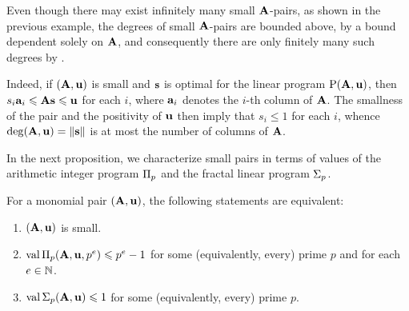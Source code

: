 \documentclass{amsart}
\begin{document}
\begin{remark}
   \label{rem: finitely many F-thresholds of small pairs}
   Even though there may exist infinitely many small $\mathbf{A}$-pairs, as shown in the previous example, the degrees of small $\mathbf{A}$-pairs are bounded above, by a bound dependent solely on $\mathbf{A}$, and consequently there are only finitely many such degrees by .
   

   Indeed, if $(\mathbf{A},\mathbf{u})$ is small and $\mathbf{s}$ is optimal for the linear program $\mathrm{P}(\mathbf{A},\mathbf{u})$, then $s_i\mathbf{a}_i \leqslant \mathbf{A}\mathbf{s} \leqslant \mathbf{u}$ for each $i$, where $\mathbf{a}_i$ denotes the $i$-th column of $\mathbf{A}$.
   The smallness of the pair and the positivity of $\mathbf{u}$ then imply that $s_i \le 1$ for each $i$, whence $\operatorname{deg}(\mathbf{A},\mathbf{u}) = \| \mathbf{s} \|$ is at most the number of columns of $\mathbf{A}$. 
\end{remark}

In the next proposition, we characterize small pairs in terms of values of the arithmetic integer program $\Pi_p$ and the fractal linear program $\Sigma_p$.

\begin{proposition}
   \label{trivial small value bound: P}
   For a monomial pair $(\mathbf{A},\mathbf{u})$, the following statements are equivalent\textup:   
   \begin{enumerate}[$(1)$]
      \item $(\mathbf{A}, \mathbf{u})$ is small.
      \item $\operatorname{val} \Pi_p(\mathbf{A}, \mathbf{u}, p^e) \leqslant p^e-1$ for some \textup(equivalently, every\textup) prime $p$ and for each $e\in \mathbb{N}$.
      \item $\operatorname{val} \Sigma_p(\mathbf{A},\mathbf{u}) \leqslant 1$ for some \textup(equivalently, every\textup) prime $p$.
   \end{enumerate}
\end{proposition}
\end{document}
